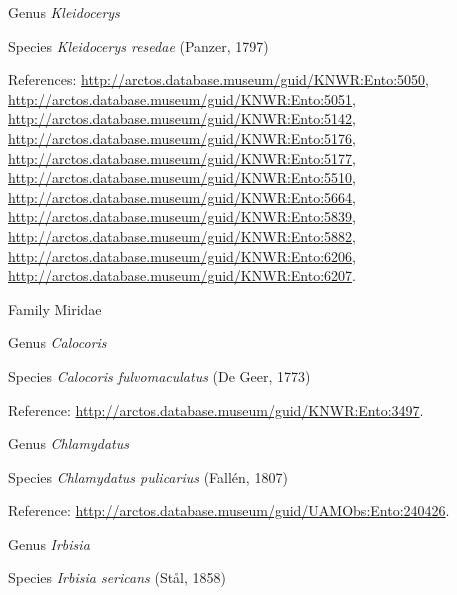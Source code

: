 \documentclass[9pt, article]{memoir}
\begin{document}
\begin{multicols}{2}
\vspace{6pt}\noindent\hspace{30pt}Genus \textit{Kleidocerys}


\vspace{6pt}\noindent\hspace{36pt}Species \textit{Kleidocerys resedae} (Panzer, 1797)


References: 
\url{http://arctos.database.museum/guid/KNWR:Ento:5050}, 
\url{http://arctos.database.museum/guid/KNWR:Ento:5051}, 
\url{http://arctos.database.museum/guid/KNWR:Ento:5142}, 
\url{http://arctos.database.museum/guid/KNWR:Ento:5176}, 
\url{http://arctos.database.museum/guid/KNWR:Ento:5177}, 
\url{http://arctos.database.museum/guid/KNWR:Ento:5510}, 
\url{http://arctos.database.museum/guid/KNWR:Ento:5664}, 
\url{http://arctos.database.museum/guid/KNWR:Ento:5839}, 
\url{http://arctos.database.museum/guid/KNWR:Ento:5882}, 
\url{http://arctos.database.museum/guid/KNWR:Ento:6206}, 
\url{http://arctos.database.museum/guid/KNWR:Ento:6207}.

\vspace{6pt}\noindent\hspace{24pt}Family Miridae


\vspace{6pt}\noindent\hspace{30pt}Genus \textit{Calocoris}


\vspace{6pt}\noindent\hspace{36pt}Species \textit{Calocoris fulvomaculatus} (De Geer, 1773)


Reference: 
\url{http://arctos.database.museum/guid/KNWR:Ento:3497}.

\vspace{6pt}\noindent\hspace{30pt}Genus \textit{Chlamydatus}


\vspace{6pt}\noindent\hspace{36pt}Species \textit{Chlamydatus pulicarius} (Fallén, 1807)


Reference: 
\url{http://arctos.database.museum/guid/UAMObs:Ento:240426}.

\vspace{6pt}\noindent\hspace{30pt}Genus \textit{Irbisia}


\vspace{6pt}\noindent\hspace{36pt}Species \textit{Irbisia sericans} (Stål, 1858)



\end{multicols}
\end{document}
